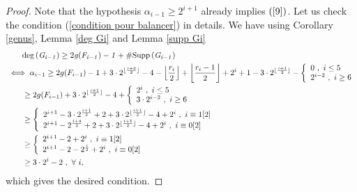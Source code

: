 \documentclass[10pt]{article}
\begin{document}
\begin{proof}
Note that the hypothesis $\alpha_{i-1} \geq 2^{i+1}$ already implies $(\ref{9})$. Let us check the condition (\ref{condition pour balancer}) in details. We have using Corollary \ref{genus}, Lemma \ref{deg Gi} and  Lemma \ref{supp Gi}
\begin{align*}
 & \quad \quad  \rm deg \it \left(G_{i-1}\right)  \geq \rm 2 \it g(F_{i-1}) -1 + \#\rm Supp \it \left( G_{i-1} \right) \\
& \iff \alpha_{i-1} \geq 2g(F_{i-1}) -1 + 3 \cdot 2^{\lfloor \frac{i+3}{2}\rfloor} - 4 - \left \lfloor \frac{r_i}{2}\right\rfloor + \left \lfloor \frac{r_i-1}{2}\right\rfloor +2^i +1 - 3\cdot2^{\lfloor \frac{i+1}{2}\rfloor} - \left\{ \begin{array}{ll}
0 \ , \ i \leq 5 \\
2^{i-2} \ , \ i \geq 6
\end{array}
\right. \\
&  \quad \quad \geq 2g(F_{i-1}) + 3 \cdot 2^{\lfloor \frac{i+1}{2}\rfloor} - 4 + \left\{ \begin{array}{ll}
2^i \ , \ i \leq 5 \\
3 \cdot 2^{i-2} \ , \ i \geq 6
\end{array}
\right. \\
&  \quad \quad \geq \left\{ \begin{array}{ll}
2^{i+1}-3\cdot 2^{\frac{i+1}{2}} +2 + 3 \cdot 2^{\lfloor \frac{i+1}{2}\rfloor} - 4 +2^i \ , \ i\equiv 1[2]\\
2^{i+1}- 2^{\frac{i+4}{2}} +2 + 3 \cdot 2^{\lfloor \frac{i+1}{2}\rfloor} - 4 +2^i \ , \ i\equiv 0[2]
\end{array}
\right. \\
& \quad \quad \geq \left\{ \begin{array}{ll}
2^{i+1}-2 +2^i \ , \ i\equiv 1[2]\\
2^{i+1}- 2-2^{\frac{i}{2}} + 2^i \ , \ i\equiv 0[2]
\end{array}
\right. \\
& \quad \quad  \geq 3 \cdot 2^i-2 \ , \ \forall \ i,
\end{align*}
which gives the desired condition.
\end{proof}



























\newpage


\end{document}
